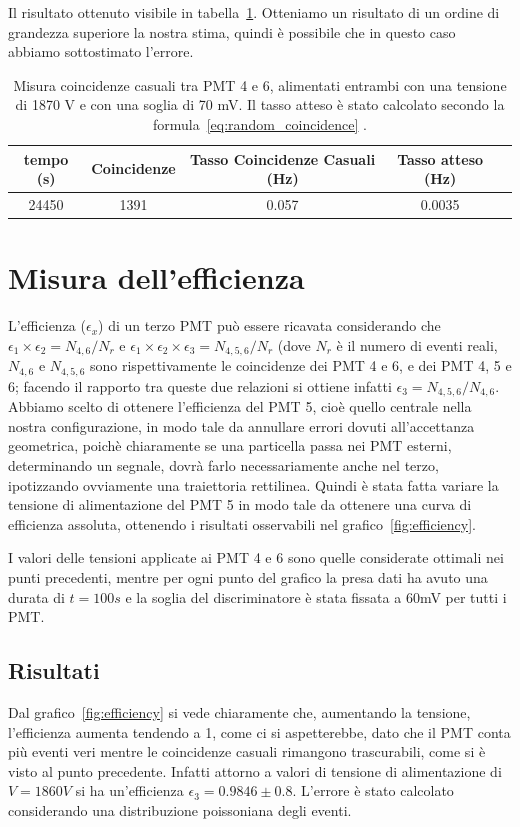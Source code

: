 \documentclass[a4paper,10pt]{article}
\begin{document}
Il risultato ottenuto visibile in tabella~\ref{tab:random_coincidence_mesured}. Otteniamo un risultato di un ordine di grandezza superiore la nostra stima, quindi è possibile che in questo caso abbiamo sottostimato l'errore. 

\begin{table}
\centering
\begin{tabular}{|c|c|c|c|c|}
\hline 
tempo (s) & Coincidenze & Tasso Coincidenze Casuali (Hz) & Tasso atteso (Hz) \\ 
\hline 
24450 & 1391 & 0.057 & 0.0035\\ 
\hline 
\end{tabular} 
\caption{Misura coincidenze casuali tra PMT 4 e 6, alimentati entrambi con una tensione di 1870 V e con una soglia di 70 mV. Il tasso atteso è stato calcolato secondo la formula~\ref{eq:random_coincidence} .}
\label{tab:random_coincidence_mesured}
\end{table}

\section{Misura dell'efficienza}
L'efficienza ($\epsilon_x$) di un terzo PMT può essere ricavata considerando che $\epsilon_1\times \epsilon_2=N_{4,6}/N_r$ e $\epsilon_1\times \epsilon_2\times \epsilon_3=N_{4,5,6}/N_r$ (dove $N_r$ è il numero di eventi reali, $N_{4,6}$ e $N_{4,5,6}$ sono rispettivamente le coincidenze dei PMT 4 e 6, e dei PMT 4, 5 e 6; facendo il rapporto tra queste due relazioni si ottiene infatti $\epsilon_3=N_{4,5,6}/N_{4,6}$. Abbiamo scelto di ottenere l'efficienza del PMT 5, cioè quello centrale nella nostra configurazione, in modo tale da annullare errori dovuti all'accettanza geometrica, poichè chiaramente se una particella passa nei PMT esterni, determinando un segnale, dovrà farlo necessariamente anche nel terzo, ipotizzando ovviamente una traiettoria rettilinea. Quindi è stata fatta variare la tensione di alimentazione del PMT 5 in modo tale da ottenere una curva di efficienza assoluta, ottenendo i risultati osservabili nel grafico~\ref{fig:efficiency}.

I valori delle tensioni applicate ai PMT 4 e 6 sono quelle considerate ottimali nei punti precedenti, mentre per ogni punto del grafico la presa dati ha avuto una durata di $t=100s$ e la soglia del discriminatore è stata fissata a 60mV per tutti i PMT.
\subsection{Risultati}
Dal grafico~\ref{fig:efficiency} si vede chiaramente che, aumentando la tensione, l'efficienza aumenta tendendo a 1, come ci si aspetterebbe, dato che il PMT conta più eventi veri mentre le coincidenze casuali rimangono trascurabili, come si è visto al punto precedente. Infatti attorno a valori di tensione di alimentazione di $V=1860V$ si ha un'efficienza $\epsilon_3=0.9846\pm0.8$. L'errore è stato calcolato considerando una distribuzione poissoniana degli eventi.
\end{document}
